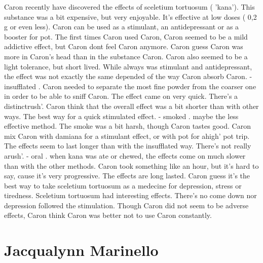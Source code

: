 \documentclass[12pt]{book}
\begin{document}
Caron recently have discovered the effects of sceletium tortuosum ( 'kana'). This substance was a bit expensive, but very enjoyable. It's effective at low doses ( 0,2 g or even less). Caron can be used as a stimulant, an antidepressant or as a booster for pot. The first times Caron used Caron, Caron seemed to be a mild addictive effect, but Caron dont feel Caron anymore. Caron guess Caron was more in Caron's head than in the substance Caron. Caron also seemed to be a light tolerance, but short lived. While always was stimulant and antidepressant, the effect was not exactly the same depended of the way Caron absorb Caron. - insufflated . Caron needed to separate the most fine powder from the coarser one in order to be able to sniff Caron. The effect came on very quick. There's a distinctrush'. Caron think that the overall effect was a bit shorter than with other ways. The best way for a quick stimulated effect. - smoked . maybe the less effective method. The smoke was a bit harsh, though Caron tastes good. Caron mix Caron with damiana for a stimulant effect, or with pot for ahigh' pot trip. The effects seem to last longer than with the insufflated way. There's not really arush'. - oral . when kana was ate or chewed, the effects come on much slower than with the other methods. Caron took something like an hour, but it's hard to say, cause it's very progressive. The effects are long lasted. Caron guess it's the best way to take sceletium tortuosum as a medecine for depression, stress or tiredness. Sceletium tortuosum had interesting effects. There's no come down nor depression followed the stimulation. Though Caron did not seem to be adverse effects, Caron think Caron was better not to use Caron constantly.



\chapter{Jacqualynn Marinello}
\end{document}
